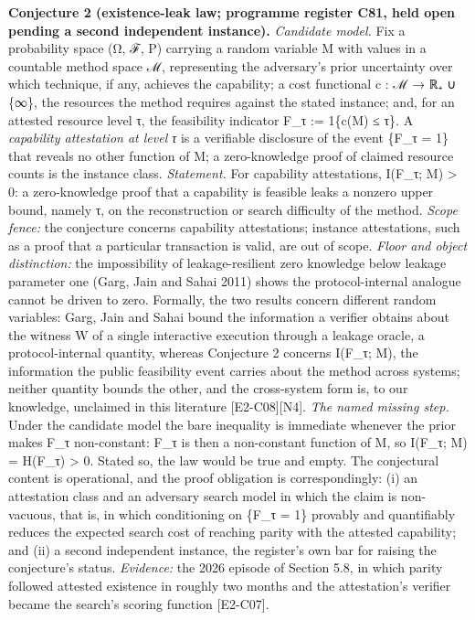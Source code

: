 \documentclass[
  11pt,
]{article}
\begin{document}
\textbf{Conjecture 2 (existence-leak law; programme register C81, held
open pending a second independent instance).} \emph{Candidate model.}
Fix a probability space (Ω, ℱ, P) carrying a random variable M with
values in a countable method space ℳ, representing the adversary's prior
uncertainty over which technique, if any, achieves the capability; a
cost functional c : ℳ → ℝ₊ ∪ \{∞\}, the resources the method requires
against the stated instance; and, for an attested resource level τ, the
feasibility indicator F\_τ := 1\{c(M) ≤ τ\}. A \emph{capability
attestation at level τ} is a verifiable disclosure of the event \{F\_τ =
1\} that reveals no other function of M; a zero-knowledge proof of
claimed resource counts is the instance class. \emph{Statement.} For
capability attestations, I(F\_τ; M) \textgreater{} 0: a zero-knowledge
proof that a capability is feasible leaks a nonzero upper bound, namely
τ, on the reconstruction or search difficulty of the method. \emph{Scope
fence:} the conjecture concerns capability attestations; instance
attestations, such as a proof that a particular transaction is valid,
are out of scope. \emph{Floor and object distinction:} the impossibility
of leakage-resilient zero knowledge below leakage parameter one (Garg,
Jain and Sahai 2011) shows the protocol-internal analogue cannot be
driven to zero. Formally, the two results concern different random
variables: Garg, Jain and Sahai bound the information a verifier obtains
about the witness W of a single interactive execution through a leakage
oracle, a protocol-internal quantity, whereas Conjecture 2 concerns
I(F\_τ; M), the information the public feasibility event carries about
the method across systems; neither quantity bounds the other, and the
cross-system form is, to our knowledge, unclaimed in this literature
{[}E2-C08{]}{[}N4{]}. \emph{The named missing step.} Under the candidate
model the bare inequality is immediate whenever the prior makes F\_τ
non-constant: F\_τ is then a non-constant function of M, so I(F\_τ; M) =
H(F\_τ) \textgreater{} 0. Stated so, the law would be true and empty.
The conjectural content is operational, and the proof obligation is
correspondingly: (i) an attestation class and an adversary search model
in which the claim is non-vacuous, that is, in which conditioning on
\{F\_τ = 1\} provably and quantifiably reduces the expected search cost
of reaching parity with the attested capability; and (ii) a second
independent instance, the register's own bar for raising the
conjecture's status. \emph{Evidence:} the 2026 episode of Section 5.8,
in which parity followed attested existence in roughly two months and
the attestation's verifier became the search's scoring function
{[}E2-C07{]}.
\end{document}
